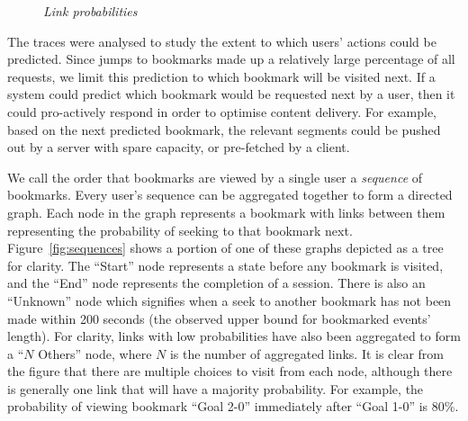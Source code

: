 \documentclass[a4paper,11pt]{article}
\newcommand{\capttext}{\protect\centering\em}
\begin{document}
\begin{figure}[tbp]
    \centering


    \caption{\capttext Link probabilities}
\end{figure}

The traces were analysed to study the extent to which users' actions could be predicted. Since jumps to bookmarks made up a relatively large percentage of all requests, we limit this prediction to which bookmark will be visited next.
If a system could predict which bookmark would be requested next by a user, then it could pro-actively respond in order to optimise content delivery. For example, based on the next predicted bookmark, the relevant segments could be pushed out by a server with spare capacity, or pre-fetched by a client.

We call the order that bookmarks are viewed by a single user a {\em sequence} of bookmarks. Every user's sequence can be aggregated together to form a directed graph. Each node in the graph represents a bookmark with links between them representing the probability of seeking to that bookmark next. Figure~\ref{fig:sequences} shows a portion of one of these graphs depicted as a tree for clarity. The ``Start'' node represents a state before any bookmark is visited, and the ``End'' node represents the completion of a session. There is also an ``Unknown'' node which signifies when a seek to another bookmark has not been made within 200 seconds (the observed upper bound for bookmarked events' length). For clarity, links with low probabilities have also been aggregated to form a ``$N$ Others'' node, where $N$ is the number of aggregated links. It is clear from the figure that there are multiple choices to visit from each node, although there is generally one link that will have a majority probability. For example, the probability of viewing bookmark ``Goal 2-0'' immediately after ``Goal 1-0'' is 80\%.
\end{document}
